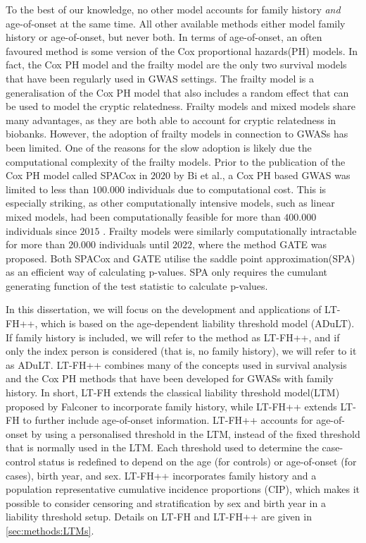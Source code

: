 To the best of our knowledge, no other model accounts for family history \textit{and} age-of-onset at the same time. All other available methods either model family history or age-of-onset, but never both. In terms of age-of-onset, an often favoured method is some version of the Cox proportional hazards(PH) models. In fact, the Cox PH model and the frailty model are the only two survival models that have been regularly used in GWAS settings. The frailty model is a generalisation of the Cox PH model that also includes a random effect that can be used to model the cryptic relatedness. Frailty models and mixed models share many advantages, as they are both able to account for cryptic relatedness in biobanks. However, the adoption of frailty models in connection to GWASs has been limited. One of the reasons for the slow adoption is likely due the computational complexity of the frailty models. Prior to the publication of the Cox PH model called SPACox in $ 2020 $ by Bi et al., a Cox PH based GWAS was limited to less than $ 100.000 $ individuals due to computational cost\cite{bi2020fast}. This is especially striking, as other computationally intensive models, such as linear mixed models, had been computationally feasible for more than $ 400.000 $ individuals since $ 2015 $ \cite{loh2015efficient}. Frailty models were similarly computationally intractable for more than $ 20.000 $ individuals until $ 2022 $, where the method GATE was proposed\cite{dey2022efficient}. Both SPACox and GATE utilise the saddle point approximation(SPA) as an efficient way of calculating p-values. SPA only requires the cumulant generating function of the test statistic to calculate p-values.

In this dissertation, we will focus on the development and applications of LT-FH++, which is based on the age-dependent liability threshold model (ADuLT). If family history is included, we will refer to the method as LT-FH++, and if only the index person is considered (that is, no family history), we will refer to it as ADuLT. LT-FH++ combines many of the concepts used in survival analysis and the Cox PH methods that have been developed for GWASs with family history. In short, LT-FH extends the classical liability threshold model(LTM) proposed by Falconer\cite{falconer1965inheritance,falconer1967inheritance} to incorporate family history, while LT-FH++ extends LT-FH to further include age-of-onset information. LT-FH++ accounts for age-of-onset by using a personalised threshold in the LTM, instead of the fixed threshold that is normally used in the LTM. Each threshold used to determine the case-control status is redefined to depend on the age (for controls) or age-of-onset (for cases), birth year, and sex. LT-FH++ incorporates family history and a population representative cumulative incidence proportions (CIP), which makes it possible to consider censoring and stratification by sex and birth year in a liability threshold setup. Details on LT-FH and LT-FH++ are given in \cref{sec:methods:LTMs}.

